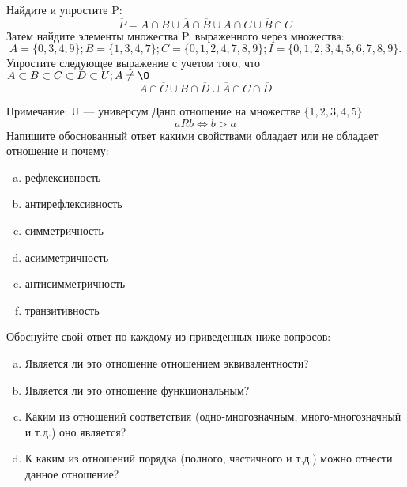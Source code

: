\documentclass[10pt]{exam}
\begin{document}
\begin{questions}
\question
Найдите и упростите P:
\begin{equation*}
\overline{P} = A \cap B \cup \overline{A} \cap \overline{B} \cup A \cap C \cup \overline{B} \cap C
\end{equation*}
Затем найдите элементы множества P, выраженного через множества:
\begin{equation*}
A = \{0, 3, 4, 9\}; 
B = \{1, 3, 4, 7\};
C = \{0, 1, 2, 4, 7, 8, 9\};
I = \{0, 1, 2, 3, 4, 5, 6, 7, 8, 9\}.
\end{equation*}\question
Упростите следующее выражение с учетом того, что $A\subset B \subset C \subset D \subset U; A \neq \O$
\begin{equation*}
A \cap  \overline{C} \cup B \cap \overline{D} \cup  \overline{A} \cap C \cap  \overline{D}
\end{equation*}

Примечание: U — универсум\question
Дано отношение на множестве $\{1, 2, 3, 4, 5\}$ 
\begin{equation*}
aRb \iff b > a
\end{equation*}
Напишите обоснованный ответ какими свойствами обладает или не обладает отношение и почему:   
\begin{enumerate} [a)]\setcounter{enumi}{0}
\item рефлексивность
\item антирефлексивность
\item симметричность
\item асимметричность
\item антисимметричность
\item транзитивность
\end{enumerate}

Обоснуйте свой ответ по каждому из приведенных ниже вопросов:
\begin{enumerate} [a)]\setcounter{enumi}{0}
    \item Является ли это отношение отношением эквивалентности?
    \item Является ли это отношение функциональным?
    \item Каким из отношений соответствия (одно-многозначным, много-многозначный и т.д.) оно является?
    \item К каким из отношений порядка (полного, частичного и т.д.) можно отнести данное отношение?
\end{enumerate}


\end{questions}
\end{document}
